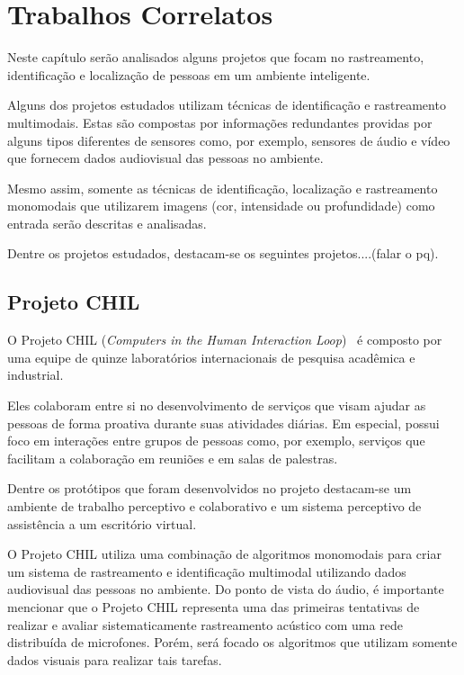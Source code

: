 \chapter{Trabalhos Correlatos}

Neste capítulo serão analisados alguns projetos que focam no rastreamento, identificação e localização de pessoas em um ambiente inteligente. 

Alguns dos projetos estudados utilizam técnicas de identificação e rastreamento multimodais. Estas são compostas por informações redundantes providas por alguns tipos diferentes de sensores como, por exemplo, sensores de áudio e vídeo que fornecem dados audiovisual  das pessoas no ambiente.

Mesmo assim, somente as técnicas de identificação, localização e rastreamento monomodais que utilizarem imagens (cor, intensidade ou profundidade) como entrada serão descritas e analisadas.

Dentre os projetos estudados, destacam-se os seguintes projetos....(falar o pq).

\section{Projeto CHIL}

O Projeto CHIL (\textit{Computers in the Human Interaction Loop})~\cite{chil, computerschil} é composto por uma equipe de quinze laboratórios internacionais de pesquisa acadêmica e industrial.

Eles colaboram entre si no desenvolvimento de serviços que visam ajudar as
pessoas de forma proativa durante suas atividades diárias. Em especial, possui
foco em interações entre grupos de pessoas como, por exemplo, serviços que
facilitam a colaboração em reuniões e em salas de palestras.

Dentre os protótipos que foram desenvolvidos no projeto destacam-se um ambiente de trabalho perceptivo e colaborativo e um sistema perceptivo de assistência a um escritório virtual.

O Projeto CHIL utiliza uma combinação de algoritmos monomodais para criar um sistema de rastreamento e identificação multimodal utilizando dados audiovisual das pessoas no ambiente. Do ponto de vista do áudio, é importante mencionar que o Projeto CHIL representa uma das primeiras tentativas de realizar e avaliar sistematicamente rastreamento acústico com uma rede distribuída de microfones. Porém, será focado os algoritmos que utilizam somente dados visuais para realizar tais tarefas.

